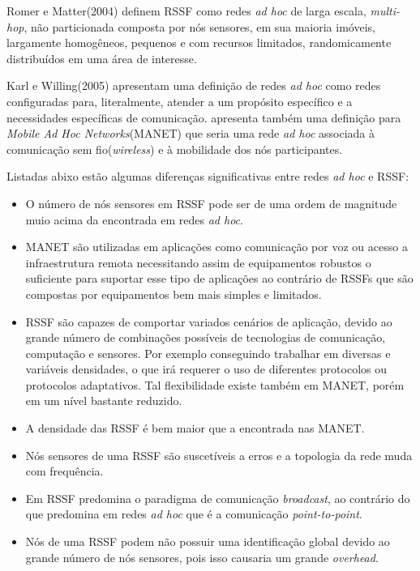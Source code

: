 Romer e Matter(2004)\cite{Romer2004} definem RSSF como redes \textit{ad hoc} de larga escala, \textit{multi-hop}, não particionada composta por nós sensores, em sua maioria imóveis, largamente homogêneos, pequenos e com recursos limitados, randomicamente distribuídos em uma área de interesse.

Karl e Willing(2005)\cite{Karl2005} apresentam uma definição de redes \textit{ad hoc} como redes configuradas para, literalmente, atender a um propósito específico e a necessidades específicas de comunicação. \cite{Karl2005} apresenta também uma definição para \textit{Mobile Ad Hoc Networks}(MANET) que seria uma rede \textit{ad hoc} associada à comunicação sem fio(\textit{wireless}) e à mobilidade dos nós participantes. 


Listadas abixo estão algumas diferenças significativas entre redes \textit{ad hoc} e RSSF:
\begin{itemize} 
	\item O número de nós sensores em RSSF pode ser de uma ordem de magnitude muio acima da encontrada em redes \textit{ad hoc}\cite{Akyildiz2002}.
	\item MANET são utilizadas em aplicações como comunicação por voz ou acesso a infraestrutura remota necessitando assim de equipamentos robustos o suficiente para suportar esse tipo de aplicações ao contrário de RSSFs que são compostas por equipamentos bem mais simples e limitados\cite{Karl2005}. 
	\item RSSF são capazes de comportar variados cenários de aplicação, devido ao grande número de combinações possíveis de tecnologias de comunicação, computação e sensores. Por exemplo conseguindo trabalhar em diversas e variáveis densidades, o que irá requerer o uso de diferentes protocolos ou protocolos adaptativos. Tal flexibilidade existe também em MANET, porém em um nível bastante reduzido\cite{Karl2005}. 
	\item A densidade das RSSF é bem maior que a encontrada nas MANET\cite{Akyildiz2002}.
	\item Nós sensores de uma RSSF são suscetíveis a erros e a topologia da rede muda com frequência\cite{Akyildiz2002}. 
	\item Em RSSF predomina o paradigma de comunicação \textit{broadcast}, ao contrário do que predomina em redes \textit{ad hoc} que é a comunicação \textit{point-to-point}.
	\item Nós de uma RSSF podem não possuir uma identificação global devido ao grande número de nós sensores, pois isso causaria um grande \textit{overhead}.
\end{itemize} 

